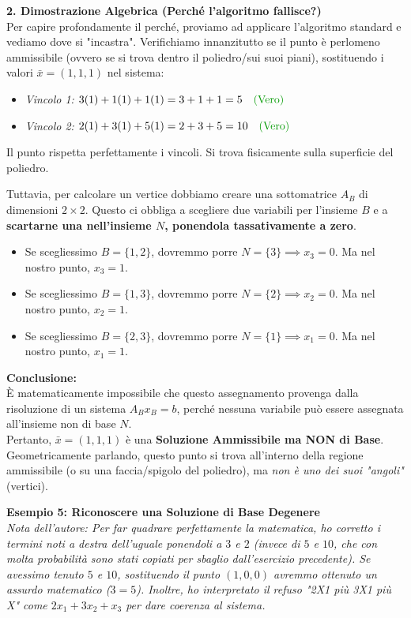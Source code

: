 \documentclass[12pt, a4paper]{article}
\begin{document}
	\vspace{0.4cm}
	\textbf{2. Dimostrazione Algebrica (Perché l'algoritmo fallisce?)}\\
	Per capire profondamente il perché, proviamo ad applicare l'algoritmo standard e vediamo dove si "incastra".
	Verifichiamo innanzitutto se il punto è perlomeno ammissibile (ovvero se si trova dentro il poliedro/sui suoi piani), sostituendo i valori $\bar{x} = (1,1,1)$ nel sistema:
	\begin{itemize}[label=$\circ$, itemsep=2pt, leftmargin=1.5cm]
		\item \textit{Vincolo 1:} $3(1) + 1(1) + 1(1) = 3 + 1 + 1 = 5 \quad \text{\textcolor{green!60!black}{(Vero)}}$
		\item \textit{Vincolo 2:} $2(1) + 3(1) + 5(1) = 2 + 3 + 5 = 10 \quad \text{\textcolor{green!60!black}{(Vero)}}$
	\end{itemize}
	Il punto rispetta perfettamente i vincoli. Si trova fisicamente sulla superficie del poliedro.
	
	Tuttavia, per calcolare un vertice dobbiamo creare una sottomatrice $A_B$ di dimensioni $2 \times 2$. Questo ci obbliga a scegliere due variabili per l'insieme $B$ e a \textbf{scartarne una nell'insieme $N$, ponendola tassativamente a zero}.
	\begin{itemize}
		\item Se scegliessimo $B = \{1, 2\}$, dovremmo porre $N = \{3\} \implies x_3 = 0$. Ma nel nostro punto, $x_3 = 1$.
		\item Se scegliessimo $B = \{1, 3\}$, dovremmo porre $N = \{2\} \implies x_2 = 0$. Ma nel nostro punto, $x_2 = 1$.
		\item Se scegliessimo $B = \{2, 3\}$, dovremmo porre $N = \{1\} \implies x_1 = 0$. Ma nel nostro punto, $x_1 = 1$.
	\end{itemize}
	
	\textbf{Conclusione:}\\
	È matematicamente impossibile che questo assegnamento provenga dalla risoluzione di un sistema $A_B x_B = b$, perché nessuna variabile può essere assegnata all'insieme non di base $N$. \\
	Pertanto, $\bar{x} = (1, 1, 1)$ è una \textbf{Soluzione Ammissibile ma NON di Base}. Geometricamente parlando, questo punto si trova all'interno della regione ammissibile (o su una faccia/spigolo del poliedro), ma \textit{non è uno dei suoi "angoli"} (vertici).
	
	\vspace{0.6cm}
	\textbf{Esempio 5: Riconoscere una Soluzione di Base Degenere}\\
	\textit{Nota dell'autore: Per far quadrare perfettamente la matematica, ho corretto i termini noti a destra dell'uguale ponendoli a $3$ e $2$ (invece di $5$ e $10$, che con molta probabilità sono stati copiati per sbaglio dall'esercizio precedente). Se avessimo tenuto $5$ e $10$, sostituendo il punto $(1,0,0)$ avremmo ottenuto un assurdo matematico ($3=5$). Inoltre, ho interpretato il refuso "2X1 più 3X1 più X" come $2x_1 + 3x_2 + x_3$ per dare coerenza al sistema.}
	
\end{document}
